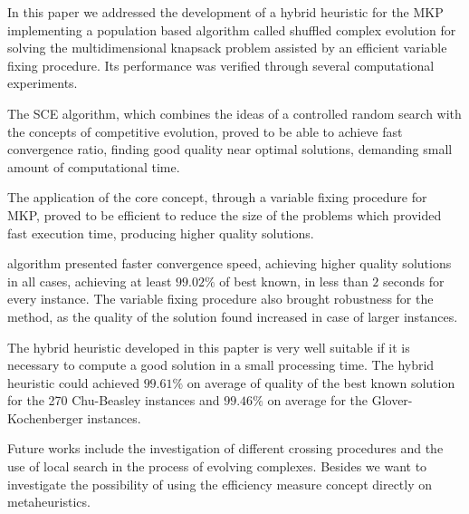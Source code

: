 
In this paper we addressed the development of a hybrid heuristic for the MKP
implementing a population based algorithm called shuffled complex evolution
for solving the multidimensional knapsack problem assisted by an efficient
variable fixing procedure.
Its performance was verified through several computational experiments.

The SCE algorithm, which combines the ideas of a controlled random search with
the concepts of competitive evolution, proved to be able to achieve fast
convergence ratio, finding good quality near optimal solutions, demanding small
amount of computational time.

The application of the core concept, through a variable fixing procedure for MKP,
proved to be efficient to reduce the size of the problems which provided fast
execution time, producing higher quality solutions.

\scecore algorithm presented faster convergence speed, achieving higher
quality solutions in all cases, achieving at least $99.02\%$ of best known, in less than $2$ seconds
for every instance.
The variable fixing procedure also brought robustness for the method, as the quality
of the solution found increased in case of larger instances.

The hybrid heuristic developed in this papter is very well suitable if it is necessary
to compute a good solution in a small processing time.
The hybrid heuristic could achieved $99.61\%$ on average of quality of the best known solution for
the 270 Chu-Beasley instances and $99.46\%$ on average for the Glover-Kochenberger instances.

Future works include the investigation of different crossing procedures 
and the use of local search in the process of evolving complexes.
Besides we want to investigate the possibility of using the efficiency measure
concept directly on metaheuristics.

